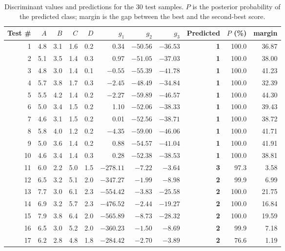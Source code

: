 \begin{table}[htbp]
\centering
\footnotesize
\caption{Discriminant values and predictions for the 30 test samples. $P$ is the posterior probability of the predicted class;
margin is the gap between the best and the second-best score.}
\begin{tabular}{@{}rrrrrrrrrrr@{}}
\toprule
Test \# & $A$ & $B$ & $C$ & $D$ & $g_1$ & $g_2$ & $g_3$ & Predicted & $P$ (\%) & margin \\
\midrule
1 & 4.8 & 3.1 & 1.6 & 0.2 & 0.34 & $-50.56$ & $-36.53$ & \textbf{1} & 100.0 & 36.87 \\
2 & 5.1 & 3.5 & 1.4 & 0.3 & 0.97 & $-51.05$ & $-37.03$ & \textbf{1} & 100.0 & 38.00 \\
3 & 4.8 & 3.0 & 1.4 & 0.1 & $-0.55$ & $-55.39$ & $-41.78$ & \textbf{1} & 100.0 & 41.23 \\
4 & 5.7 & 3.8 & 1.7 & 0.3 & $-2.45$ & $-48.49$ & $-34.84$ & \textbf{1} & 100.0 & 32.39 \\
5 & 5.5 & 4.2 & 1.4 & 0.2 & $-2.27$ & $-59.89$ & $-46.57$ & \textbf{1} & 100.0 & 44.30 \\
6 & 5.0 & 3.4 & 1.5 & 0.2 & 1.10 & $-52.06$ & $-38.33$ & \textbf{1} & 100.0 & 39.43 \\
7 & 4.6 & 3.1 & 1.5 & 0.2 & 0.01 & $-52.56$ & $-38.71$ & \textbf{1} & 100.0 & 38.72 \\
8 & 5.8 & 4.0 & 1.2 & 0.2 & $-4.35$ & $-59.00$ & $-46.06$ & \textbf{1} & 100.0 & 41.71 \\
9 & 5.0 & 3.6 & 1.4 & 0.2 & 0.88 & $-54.57$ & $-41.04$ & \textbf{1} & 100.0 & 41.91 \\
10 & 4.6 & 3.4 & 1.4 & 0.3 & 0.28 & $-52.38$ & $-38.53$ & \textbf{1} & 100.0 & 38.81 \\
11 & 6.0 & 2.2 & 5.0 & 1.5 & $-278.11$ & $-7.22$ & $-3.64$ & \textbf{3} & 97.3 & 3.58 \\
12 & 6.5 & 3.2 & 5.1 & 2.0 & $-347.27$ & $-1.99$ & $-8.98$ & \textbf{2} & 99.9 & 6.99 \\
13 & 7.7 & 3.0 & 6.1 & 2.3 & $-554.42$ & $-3.83$ & $-25.58$ & \textbf{2} & 100.0 & 21.75 \\
14 & 6.9 & 3.2 & 5.7 & 2.3 & $-476.52$ & $-2.44$ & $-19.27$ & \textbf{2} & 100.0 & 16.84 \\
15 & 7.9 & 3.8 & 6.4 & 2.0 & $-565.89$ & $-8.73$ & $-28.32$ & \textbf{2} & 100.0 & 19.59 \\
16 & 6.5 & 3.0 & 5.2 & 2.0 & $-360.23$ & $-1.50$ & $-8.69$ & \textbf{2} & 99.9 & 7.18 \\
17 & 6.2 & 2.8 & 4.8 & 1.8 & $-284.42$ & $-2.70$ & $-3.89$ & \textbf{2} & 76.6 & 1.19 \\

\end{tabular}
\end{table}
